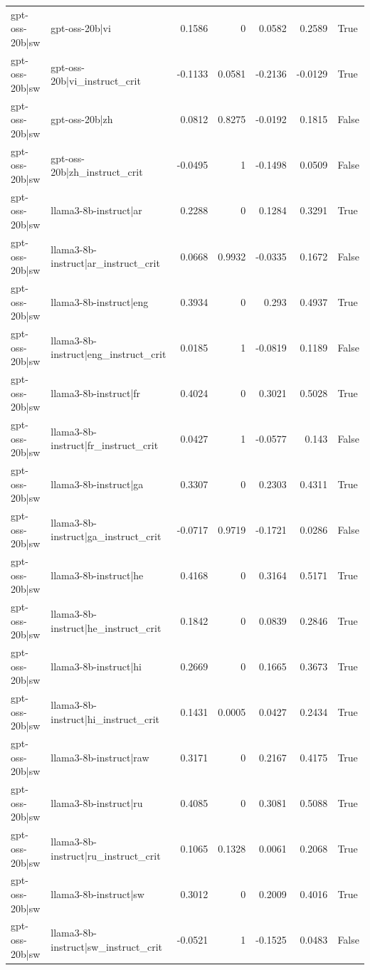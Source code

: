 \begin{table}
\begin{tabular}{l l r r r r l}
gpt-oss-20b|sw & gpt-oss-20b|vi & 0.1586 & 0 & 0.0582 & 0.2589 & True \\
gpt-oss-20b|sw & gpt-oss-20b|vi_instruct_crit & -0.1133 & 0.0581 & -0.2136 & -0.0129 & True \\
gpt-oss-20b|sw & gpt-oss-20b|zh & 0.0812 & 0.8275 & -0.0192 & 0.1815 & False \\
gpt-oss-20b|sw & gpt-oss-20b|zh_instruct_crit & -0.0495 & 1 & -0.1498 & 0.0509 & False \\
gpt-oss-20b|sw & llama3-8b-instruct|ar & 0.2288 & 0 & 0.1284 & 0.3291 & True \\
gpt-oss-20b|sw & llama3-8b-instruct|ar_instruct_crit & 0.0668 & 0.9932 & -0.0335 & 0.1672 & False \\
gpt-oss-20b|sw & llama3-8b-instruct|eng & 0.3934 & 0 & 0.293 & 0.4937 & True \\
gpt-oss-20b|sw & llama3-8b-instruct|eng_instruct_crit & 0.0185 & 1 & -0.0819 & 0.1189 & False \\
gpt-oss-20b|sw & llama3-8b-instruct|fr & 0.4024 & 0 & 0.3021 & 0.5028 & True \\
gpt-oss-20b|sw & llama3-8b-instruct|fr_instruct_crit & 0.0427 & 1 & -0.0577 & 0.143 & False \\
gpt-oss-20b|sw & llama3-8b-instruct|ga & 0.3307 & 0 & 0.2303 & 0.4311 & True \\
gpt-oss-20b|sw & llama3-8b-instruct|ga_instruct_crit & -0.0717 & 0.9719 & -0.1721 & 0.0286 & False \\
gpt-oss-20b|sw & llama3-8b-instruct|he & 0.4168 & 0 & 0.3164 & 0.5171 & True \\
gpt-oss-20b|sw & llama3-8b-instruct|he_instruct_crit & 0.1842 & 0 & 0.0839 & 0.2846 & True \\
gpt-oss-20b|sw & llama3-8b-instruct|hi & 0.2669 & 0 & 0.1665 & 0.3673 & True \\
gpt-oss-20b|sw & llama3-8b-instruct|hi_instruct_crit & 0.1431 & 0.0005 & 0.0427 & 0.2434 & True \\
gpt-oss-20b|sw & llama3-8b-instruct|raw & 0.3171 & 0 & 0.2167 & 0.4175 & True \\
gpt-oss-20b|sw & llama3-8b-instruct|ru & 0.4085 & 0 & 0.3081 & 0.5088 & True \\
gpt-oss-20b|sw & llama3-8b-instruct|ru_instruct_crit & 0.1065 & 0.1328 & 0.0061 & 0.2068 & True \\
gpt-oss-20b|sw & llama3-8b-instruct|sw & 0.3012 & 0 & 0.2009 & 0.4016 & True \\
gpt-oss-20b|sw & llama3-8b-instruct|sw_instruct_crit & -0.0521 & 1 & -0.1525 & 0.0483 & False \\

\end{tabular}
\end{table}
